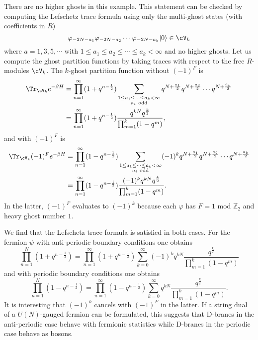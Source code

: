 \documentclass[a4paper,12pt]{article}
\begin{document}
There are no higher ghosts in this example. This statement can be checked by computing the Lefschetz trace formula using only the multi-ghost states (with coefficients in $R$)
\begin{equation}
\varphi_{-2N-a_1} \varphi_{-2N-a_2} \cdots \varphi_{-2N-a_k} |0 \rangle \in \cV_k
\end{equation}
where $a = 1,3,5, \cdots$ with $1 \leq a_1 \leq a_2 \leq \cdots \leq a_k < \infty$ and no higher ghosts. Let us compute the ghost partition functions by taking traces with respect to the free $R$-modules $\cV_k$. The $k$-ghost partition function without $(-1)^F$ is
\begin{align}
    \Tr_{\cV_k} e^{-\beta H} &= \prod_{n=1}^\infty (1 + q^{n-\frac{1}{2}}) \sum_{\substack{1 \leq a_1 \leq \cdots \leq a_k < \infty \\ a_i \ \mathrm{odd}}} q^{N + \frac{a_1}{2}} q^{N + \frac{a_2}{2}} \cdots q^{N + \frac{a_k}{2}} \nonumber \\
    &= \prod_{n=1}^\infty (1 + q^{n-\frac{1}{2}}) \frac{q^{k N} q^{\frac{k}{2}}}{\prod_{m=1}^k(1-q^m)},
\end{align}
and with $(-1)^F$ is
\begin{align}
    \Tr_{\cV_k} (-1)^F e^{-\beta H} &= \prod_{n=1}^\infty (1 - q^{n-\frac{1}{2}}) \sum_{\substack{1 \leq a_1 \leq \cdots \leq a_k < \infty \\ a_i \ \mathrm{odd}}} (-1)^k q^{N + \frac{a_1}{2}} q^{N + \frac{a_2}{2}} \cdots q^{N + \frac{a_k}{2}} \nonumber \\
    &= \prod_{n=1}^\infty (1 - q^{n-\frac{1}{2}}) \frac{(-1)^k q^{k N} q^{\frac{k}{2}}}{\prod_{m=1}^k(1-q^m)}.
\end{align}
In the latter, $(-1)^F$ evaluates to $(-1)^k$ because each $\varphi$ has $F = 1$ mod $\mathbb{Z}_2$ and heavy ghost number $1$.

We find that the Lefschetz trace formula is satisfied in both cases. For the fermion $\psi$ with anti-periodic boundary conditions one obtains
\begin{equation}
\prod_{n=1}^N (1 + q^{n-\frac{1}{2}}) = \prod_{n=1}^\infty (1 + q^{n-\frac{1}{2}}) \sum_{k=0}^\infty (-1)^k q^{k N} \frac{q^{\frac{k}{2}}}{\prod_{m=1}^k(1-q^m)}
\end{equation}
and with periodic boundary conditions one obtains
\begin{equation}
\prod_{n=1}^N (1 - q^{n-\frac{1}{2}}) = \prod_{n=1}^\infty (1 - q^{n-\frac{1}{2}}) \sum_{k=0}^\infty q^{k N} \frac{q^{\frac{k}{2}}}{\prod_{m=1}^k(1-q^m)}.
\end{equation}
It is interesting that $(-1)^k$ cancels with $(-1)^F$ in the latter. If a string dual of a $U(N)$-gauged fermion can be formulated, this suggests that D-branes in the anti-periodic case behave with fermionic statistics while D-branes in the periodic case behave as bosons. 
\end{document}
